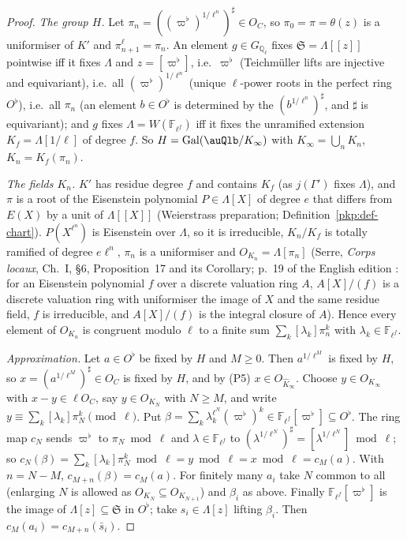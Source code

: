 \documentclass[10pt]{amsart}
\theoremstyle{definition}
\theoremstyle{remark}
\newcommand{\Q}{\mathbb Q}
\begin{document}
\begin{proof}
\emph{The group $H$.} Let $\pi_n=((\varpi^\flat)^{1/\ell^n})^\sharp\in O_C$, so $\pi_0=\pi=\theta(z)$ is a
uniformiser of $K'$ and $\pi_{n+1}^\ell=\pi_n$. An element $g\in G_{\Q_\ell}$ fixes $\mathfrak S=\Lambda[[z]]$
pointwise iff it fixes $\Lambda$ and $z=[\varpi^\flat]$, i.e.\ $\varpi^\flat$ (Teichm\"uller lifts are
injective and equivariant), i.e.\ all $(\varpi^\flat)^{1/\ell^n}$ (unique $\ell$-power roots in the perfect
ring $O^\flat$), i.e.\ all $\pi_n$ (an element $b\in O^\flat$ is determined by the $(b^{1/\ell^n})^\sharp$,
and $\sharp$ is equivariant); and $g$ fixes $\Lambda=W(\mathbb F_{\ell^f})$ iff it fixes the unramified
extension $K_f=\Lambda[1/\ell]$ of degree $f$. So $H=\operatorname{Gal}(\auQlb/K_\infty)$ with
$K_\infty=\bigcup_nK_n$, $K_n=K_f(\pi_n)$.

\emph{The fields $K_n$.} $K'$ has residue degree $f$ and contains $K_f$ (as $j(\Gamma')$ fixes $\Lambda$), and
$\pi$ is a root of the Eisenstein polynomial $P\in\Lambda[X]$ of degree $e$ that differs from $E(X)$ by a
unit of $\Lambda[[X]]$ (Weierstrass preparation; Definition~\ref{pkp:def-chart}). $P(X^{\ell^n})$ is
Eisenstein over $\Lambda$, so it is irreducible, $K_n/K_f$ is totally ramified of degree $e\ell^n$, $\pi_n$ is
a uniformiser and $O_{K_n}=\Lambda[\pi_n]$ (Serre, \emph{Corps locaux}, Ch.~I, \S6, Proposition~17 and its Corollary; p.~19 of the English edition \cite{SerreLF}: for an Eisenstein polynomial $f$ over a discrete valuation ring $A$, $A[X]/(f)$ is a discrete valuation ring with uniformiser the image of $X$ and the same residue field, $f$ is irreducible, and $A[X]/(f)$ is the integral closure of $A$). Hence every element
of $O_{K_n}$ is congruent modulo $\ell$ to a finite sum $\sum_k[\lambda_k]\pi_n^k$ with
$\lambda_k\in\mathbb F_{\ell^f}$.

\emph{Approximation.} Let $a\in O^\flat$ be fixed by $H$ and $M\ge0$. Then $a^{1/\ell^M}$ is fixed by $H$,
so $x=(a^{1/\ell^M})^\sharp\in O_C$ is fixed by $H$, and by (P5) $x\in O_{\hat K_\infty}$. Choose
$y\in O_{K_\infty}$ with $x-y\in\ell O_C$, say $y\in O_{K_N}$ with $N\ge M$, and write
$y\equiv\sum_k[\lambda_k]\pi_N^k\pmod\ell$. Put $\beta=\sum_k\lambda_k^{\ell^N}(\varpi^\flat)^k\in
\mathbb F_{\ell^f}[\varpi^\flat]\subseteq O^\flat$. The ring map $c_N$ sends $\varpi^\flat$ to
$\pi_N\bmod\ell$ and $\lambda\in\mathbb F_{\ell^f}$ to $(\lambda^{1/\ell^N})^\sharp=[\lambda^{1/\ell^N}]
\bmod\ell$; so $c_N(\beta)=\sum_k[\lambda_k]\pi_N^k\bmod\ell=y\bmod\ell=x\bmod\ell=c_M(a)$. With $n=N-M$,
$c_{M+n}(\beta)=c_M(a)$. For finitely many $a_i$ take $N$ common to all (enlarging $N$ is allowed as
$O_{K_N}\subseteq O_{K_{N+1}}$) and $\beta_i$ as above. Finally $\mathbb F_{\ell^f}[\varpi^\flat]$ is the
image of $\Lambda[z]\subseteq\mathfrak S$ in $O^\flat$; take $s_i\in\Lambda[z]$ lifting $\beta_i$. Then
$c_M(a_i)=c_{M+n}(\bar s_i)$.
\end{proof}
\end{document}

